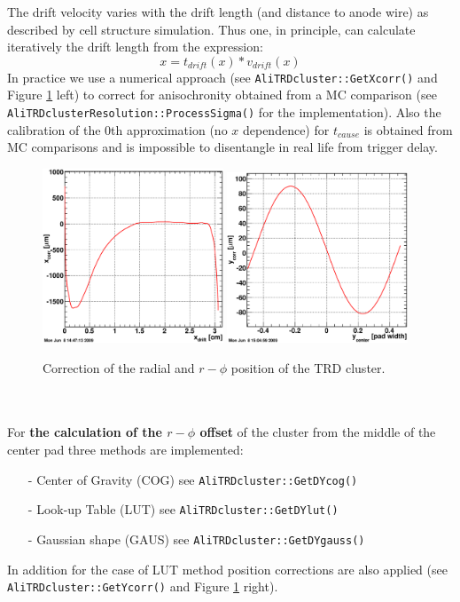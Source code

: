 \documentclass{alicetdr}
\begin{document}
The drift velocity varies with the drift length (and distance to anode wire) 
as described by cell structure simulation. Thus one, in principle, can calculate 
iteratively the drift length from the expression:
\begin{equation}
x = t_{drift}(x)*v_{drift}(x)
\end{equation}
In practice we use a numerical approach (see {\tt AliTRDcluster::GetXcorr()} 
and Figure \ref{FIG_CLUSTER:Xcorr} left) to correct for anisochronity obtained 
from a MC comparison (see {\tt AliTRDclusterResolution\-::ProcessSigma()} for 
the implementation). Also the calibration of the 0th approximation (no $x$ 
dependence) for $t_{cause}$ is obtained from MC comparisons and is impossible 
to disentangle in real life from trigger delay.
\begin{figure}[htb]
\begin{center}
\includegraphics[width=0.48\textwidth]{plots/clusterXcorr.eps}
\includegraphics[width=0.48\textwidth]{plots/clusterYcorr.eps}
\end{center}
\caption{
Correction of the radial and $r-\phi$ position of the TRD cluster.}
\label{FIG_CLUSTER:Xcorr}
\end{figure}
\\
\\
For {\bf the calculation of the $r-\phi$ offset} of the cluster from the middle 
of the center pad three methods are implemented:
\begin{itemize}
  \item[-] Center of Gravity (COG) see {\tt AliTRDcluster::GetDYcog()}
  \item[-] Look-up Table (LUT) see {\tt AliTRDcluster::GetDYlut()}
  \item[-] Gaussian shape (GAUS) see {\tt AliTRDcluster::GetDYgauss()}
\end{itemize}
In addition for the case of LUT method position corrections are also applied 
(see {\tt AliTRDcluster\-::GetYcorr()} and Figure \ref{FIG_CLUSTER:Xcorr} right).
\end{document}
